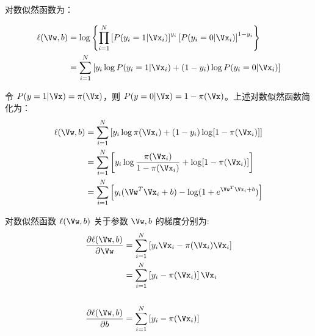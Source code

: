 对数似然函数为：

\begin{align}
	\ell(\Vw, b) &= \log\left\{
						\prod_{i = 1}^N \left[P(y_i = 1 | \Vx_i)\right]^{y_i} 
						\left[P(y_i = 0 | \Vx_i)\right]^{1 - y_i} 
						\right\} \nonumber \\
	             &= \sum\limits_{i=1}^N\left[
						 y_i\log P(y_i = 1 | \Vx_i)+(1-y_i)\log P(y_i = 0 | \Vx_i)
						 \right] \nonumber 
\end{align}

令 $ P(y=1|\Vx) = \pi(\Vx) $，则 $ P(y=0|\Vx) = 1 - \pi(\Vx) $。上述对数似然函数简化为：
\begin{align}
	\ell(\Vw, b) &= \sum\limits_{i=1}^N \left[
					y_i\log \pi(\Vx_i) + (1-y_i)\log[1-\pi(\Vx_i)]
					\right] \nonumber \\
	             &= \sum\limits_{i=1}^N \left[
	             	y_i \log \frac{\pi(\Vx_i)}{1-\pi(\Vx_i)} + \log[1-\pi(\Vx_i)]
	             	\right] \nonumber \\
	             &= \sum\limits_{i=1}^N \left[
	             	y_i (\Vw^T\Vx_i+b) - \log (1 + e^{\Vw^T\Vx_i+b})
	             	\right]
\end{align}


对数似然函数 $ \ell(\Vw, b) $ 关于参数 $ \Vw, b $ 的梯度分别为:
\begin{align}
	\frac{\partial \ell(\Vw, b)}{\partial \Vw} &= \sum \limits_{i=1}^N \left[
		                                          y_i \Vx_i - \pi(\Vx_i) \Vx_i
		                                          \right]  \nonumber \\
		                                       &= \sum \limits_{i=1}^N \left[
												  y_i - \pi(\Vx_i) 
												  \right] \Vx_i \\ \nonumber \\
	\frac{\partial \ell(\Vw, b)}{\partial b} &= \sum \limits_{i=1}^N \left[
		                                          y_i - \pi(\Vx_i)
		                                          \right]
\end{align}

